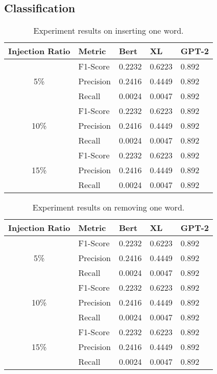 \begin{appendix}

\section{Classification}

\begin{table}
\centering
\begin{tabular}{ c l l l l }
\toprule
Injection Ratio & Metric & Bert & XL & GPT-2\\
\midrule
     & F1-Score & 0.2232 & 0.6223 & 0.892\\
5\%  & Precision & 0.2416 & 0.4449 & 0.892\\
     & Recall & 0.0024 & 0.0047 & 0.892\\ 
\midrule
     & F1-Score & 0.2232 & 0.6223 & 0.892\\
10\% & Precision & 0.2416 & 0.4449 & 0.892\\
     & Recall & 0.0024 & 0.0047 & 0.892\\ 
\midrule
     & F1-Score & 0.2232 & 0.6223 & 0.892\\
15\% & Precision & 0.2416 & 0.4449 & 0.892\\
     & Recall & 0.0024 & 0.0047 & 0.892\\ 
\bottomrule
\end{tabular}
\caption{Experiment results on inserting one word.}
\end{table}



\begin{table}
\centering
\begin{tabular}{ c l l l l }
\toprule
Injection Ratio & Metric & Bert & XL & GPT-2\\
\midrule
     & F1-Score & 0.2232 & 0.6223 & 0.892\\
5\%  & Precision & 0.2416 & 0.4449 & 0.892\\
     & Recall & 0.0024 & 0.0047 & 0.892\\ 
\midrule
     & F1-Score & 0.2232 & 0.6223 & 0.892\\
10\% & Precision & 0.2416 & 0.4449 & 0.892\\
     & Recall & 0.0024 & 0.0047 & 0.892\\ 
\midrule
     & F1-Score & 0.2232 & 0.6223 & 0.892\\
15\% & Precision & 0.2416 & 0.4449 & 0.892\\
     & Recall & 0.0024 & 0.0047 & 0.892\\ 
\bottomrule
\end{tabular}
\caption{Experiment results on removing one word.}
\end{table}



\end{appendix}
